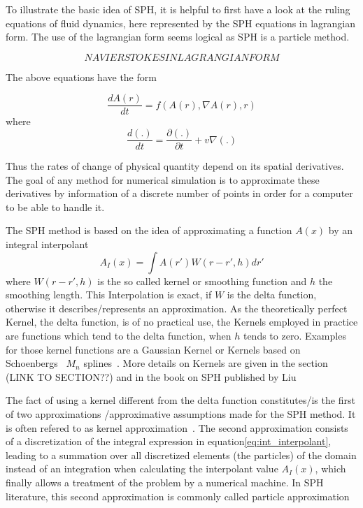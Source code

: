 \documentclass{report}
\begin{document}
To illustrate the basic idea of SPH, it is helpful to first have a look at the
ruling equations of fluid dynamics, here represented by the SPH equations in
lagrangian form. The use of the lagrangian form seems logical as SPH is a
particle method.

\begin {equation}
NAVIER STOKES IN LAGRANGIAN FORM
\end {equation}

The above equations have the form~\cite{Monaghan2005}

\begin {equation}
\label{eq:EFD_form}
{\frac{dA(r)}{dt}}=f(A(r),\nabla A(r),r)
\end {equation}
where
\begin {equation}
{\frac{d(.)}{dt}}={\frac{\partial(.)}{ \partial t}}+v\nabla(.)
\end{equation}

Thus the rates of change of  physical quantity depend on its spatial
derivatives. The goal of any method for numerical simulation is to approximate
these derivatives by information of a discrete number of points in order for a
computer to be able to handle it. 


The SPH method is based on the idea of approximating a function $A(x)$ by an
integral interpolant
\begin{equation}
\label{eq:int_interpolant}
A_I(x)=\int A(r')W(r-r',h)dr'
\end{equation}
where $W(r-r',h)$ is the so called kernel or smoothing function and $h$ the
smoothing length. This Interpolation is exact, if $W$ is the delta function,
otherwise it describes/represents an approximation. As the theoretically
perfect Kernel, the delta function, is of no practical use, the Kernels
employed in practice are functions which tend to the delta function, when $h$
tends to zero. Examples for those kernel functions are a Gaussian Kernel or
Kernels based on Schoenbergs~\cite{Schoenberg1946} $M_n$ splines~\cite{Monaghan2005}. More details on Kernels are given in the section
(LINK TO SECTION??) and in the book on SPH published by Liu~\cite{Liu2003}

The fact of using a kernel different from the delta function constitutes/is the
first of two approximations /approximative assumptions made for the SPH
method. It is often refered to as kernel approximation~\cite{Liu2003}.
The second approximation consists of a discretization of the integral
expression in equation\ref{eq:int_interpolant}, leading to a summation over
all discretized elements (the particles) of the domain instead
of an integration when calculating the interpolant value $A_I(x)$, which
finally allows a treatment of the problem by a numerical machine. In SPH
literature, this second approximation is commonly called particle
approximation~\cite{Liu2003}
\end{document}
